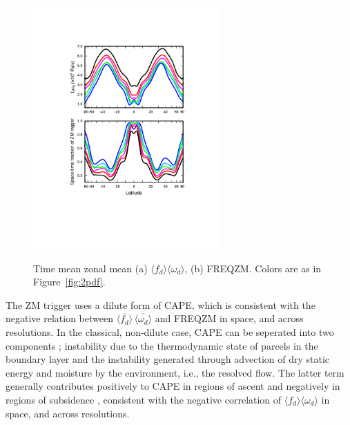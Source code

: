 \begin{figure}[t]
\begin{center}
\noindent\includegraphics[width=17pc,angle=0]{chapter6/temp_zonal_fracd*vomgd.pdf}\\
\end{center}
\caption{Time mean zonal mean (a) $\langle f_{d} \rangle \langle \omega_{d} \rangle$, (b) FREQZM. Colors are as in Figure~\ref{fig:2pdf}.}
\label{fig:vomg}
\end{figure}

The ZM trigger uses a dilute form of CAPE, which is consistent with the negative relation between $\overline{\langle f_{d} \rangle} \, \overline{\langle \omega_{d} \rangle}$ and FREQZM in space, and across resolutions. In the classical, non-dilute case, CAPE can be seperated into two components \citep{Z2002JGR}; instability due to the thermodynamic state of parcels in the boundary layer and the instability generated through advection of dry static energy and moisture by the environment, i.e., the resolved flow. The latter term generally contributes positively to CAPE in regions of ascent and negatively in regions of subsidence \citep{SZ2018JCLIM}, consistent with the negative correlation of $\langle f_{d} \rangle \langle \omega_{d} \rangle$ in space, and across resolutions.

